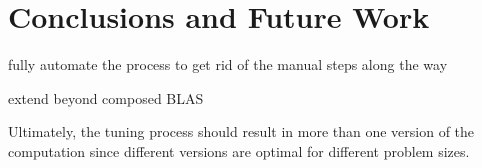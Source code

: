\documentclass[11pt]{article}
\begin{document}



\section{Conclusions and Future Work}

fully automate the process to get rid of the manual steps along the way

extend beyond composed BLAS

Ultimately, the tuning process should result in more than one version of the computation since different versions are optimal for different problem sizes.

\singlespacing


\end{document}

